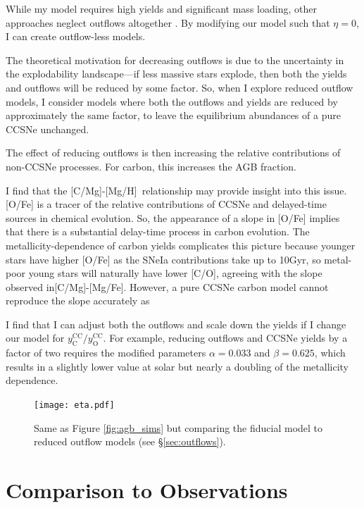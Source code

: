 \documentclass[12pt,oneside]{report}
\newcommand{\caah}{[C/Mg]-[Mg/H]}
\newcommand{\caafe}{[C/Mg]-[Mg/Fe]}
\begin{document}
While my model requires high yields and significant mass loading, other approaches neglect outflows altogether \citep{MCM13, MCM14, spitoni19, spitoni20, spitoni21}. By modifying our model such that $\eta=0$, I can create outflow-less models.


The theoretical motivation for decreasing outflows is due to the uncertainty in the explodability landscape---if less massive stars explode, then both the yields and outflows will be reduced by some factor. So, when I explore reduced outflow models, I consider models where both the outflows and yields are reduced by approximately the same factor, to leave the equilibrium abundances of a pure CCSNe unchanged. 

The effect of reducing outflows is then increasing the relative contributions of non-CCSNe processes. For carbon, this increases the AGB fraction.

I find that the \caah~relationship may provide insight into this issue. [O/Fe] is a tracer of the relative contributions of CCSNe and delayed-time sources in chemical evolution. So, the appearance of a slope in [O/Fe] implies that there is a substantial delay-time process in carbon evolution. 
The metallicity-dependence of carbon yields complicates this picture because
younger stars have higher [O/Fe] as the SNeIa contributions take up to 10Gyr,
so metal-poor young stars will naturally have lower [C/O], agreeing with the
slope observed in\caafe. However, a pure CCSNe carbon model cannot reproduce the slope accurately as  


I find that I can adjust both the outflows and scale down the yields if I change our model for $y_\text{C}^\text{CC}/y_\text{O}^\text{CC}$. For example, reducing outflows and CCSNe yields by a factor of two requires the modified parameters
$\alpha = 0.033$ and $\beta = 0.625$, which results in a slightly lower value at solar but nearly a doubling of the metallicity dependence.
\begin{figure}

\texttt{[image: eta.pdf]}

\caption[Reduced-outflow models]{Same as Figure \ref{fig:agb_sims} but comparing the fiducial model to reduced outflow models (see \S \ref{sec:outflows}).}
\end{figure}


\section{Comparison to Observations}
\end{document}
